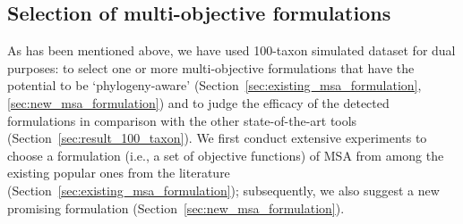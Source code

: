 \subsection{Selection of multi-objective formulations}
As has been mentioned above, we have used 100-taxon simulated dataset for dual purposes: to select one or more multi-objective formulations that have the potential to be `phylogeny-aware' (Section~\ref{sec:existing_msa_formulation}, \ref{sec:new_msa_formulation}) and to judge the efficacy of the detected formulations in comparison with the other state-of-the-art tools (Section~\ref{sec:result_100_taxon}). We first conduct extensive experiments to choose a formulation (i.e., a set of objective functions) of MSA from among the existing popular ones from the literature (Section~\ref{sec:existing_msa_formulation}); subsequently, we also suggest a new promising formulation (Section~\ref{sec:new_msa_formulation}).  

